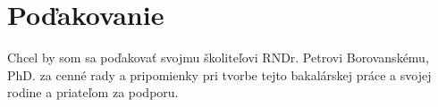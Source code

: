 \chapter{Poďakovanie}
\vfil
Chcel by som sa poďakovať svojmu školiteľovi RNDr. Petrovi Borovanskému, PhD. za cenné rady a pripomienky pri tvorbe tejto bakalárskej práce a svojej rodine a priateľom za podporu.
